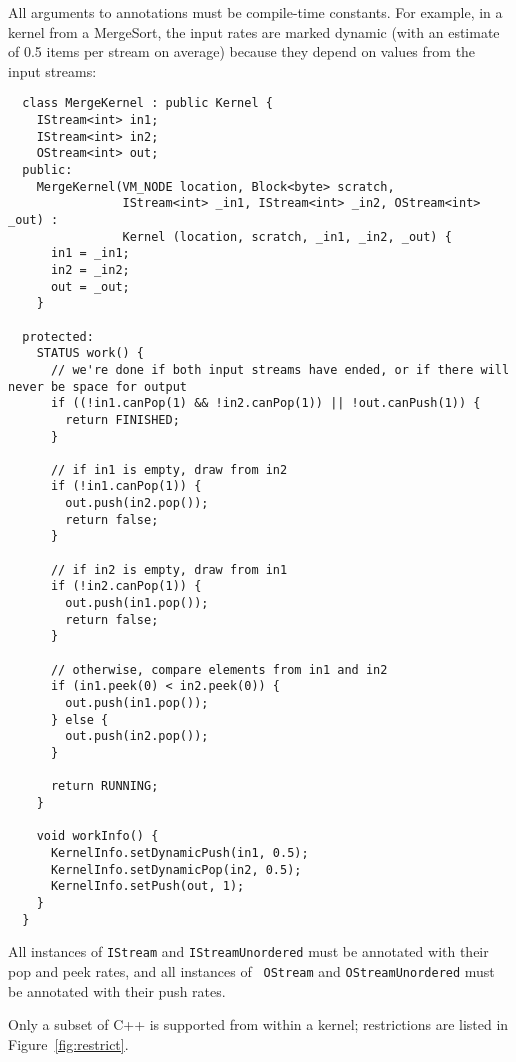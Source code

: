 All arguments to annotations must be compile-time constants.  For
example, in a kernel from a MergeSort, the input rates are marked
dynamic (with an estimate of 0.5 items per stream on average) because
they depend on values from the input streams:
{\small
\begin{verbatim}
  class MergeKernel : public Kernel {
    IStream<int> in1;
    IStream<int> in2;
    OStream<int> out;
  public:
    MergeKernel(VM_NODE location, Block<byte> scratch,
                IStream<int> _in1, IStream<int> _in2, OStream<int> _out) :
                Kernel (location, scratch, _in1, _in2, _out) {
      in1 = _in1;
      in2 = _in2;
      out = _out;
    }

  protected:
    STATUS work() {
      // we're done if both input streams have ended, or if there will never be space for output
      if ((!in1.canPop(1) && !in2.canPop(1)) || !out.canPush(1)) {
        return FINISHED;
      }

      // if in1 is empty, draw from in2
      if (!in1.canPop(1)) {          
        out.push(in2.pop());
        return false;
      }

      // if in2 is empty, draw from in1
      if (!in2.canPop(1)) {
        out.push(in1.pop());
        return false;
      } 

      // otherwise, compare elements from in1 and in2
      if (in1.peek(0) < in2.peek(0)) {
        out.push(in1.pop());
      } else {
        out.push(in2.pop());
      }

      return RUNNING;
    }

    void workInfo() {
      KernelInfo.setDynamicPush(in1, 0.5);
      KernelInfo.setDynamicPop(in2, 0.5);
      KernelInfo.setPush(out, 1);
    }
  }  
\end{verbatim}}

All instances of {\tt IStream} and {\tt IStreamUnordered} must be
annotated with their pop and peek rates, and all instances of {\tt
OStream} and {\tt OStreamUnordered} must be annotated with their push
rates.


Only a subset of C++ is supported from within a kernel; restrictions
are listed in Figure~\ref{fig:restrict}.  

